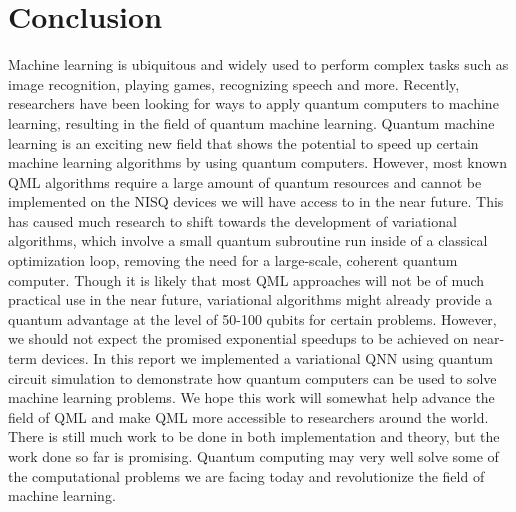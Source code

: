 \documentclass[a4paper,10pt]{article}
\begin{document}
\section{Conclusion} \label{sec:conclusion}
Machine learning is ubiquitous and widely used to perform complex tasks such as image recognition, playing games, recognizing speech and more.
Recently, researchers have been looking for ways to apply quantum computers to machine learning, resulting in the field of quantum machine learning.
Quantum machine learning is an exciting new field that shows the potential to speed up certain machine learning algorithms by using quantum computers.
However, most known QML algorithms require a large amount of quantum resources and cannot be implemented on the NISQ devices we will have access to in the near future.
This has caused much research to shift towards the development of variational algorithms, which involve a small quantum subroutine run inside of a classical optimization loop, removing the need for a large-scale, coherent quantum computer. 
Though it is likely that most QML approaches will not be of much practical use in the near future, variational algorithms might already provide a quantum advantage at the level of 50-100 qubits for certain problems.
However, we should not expect the promised exponential speedups to be achieved on near-term devices.
In this report we implemented a variational QNN using quantum circuit simulation to demonstrate how quantum computers can be used to solve machine learning problems.
We hope this work will somewhat help advance the field of QML and make QML more accessible to researchers around the world.
There is still much work to be done in both implementation and theory, but the work done so far is promising.
Quantum computing may very well solve some of the computational problems we are facing today and revolutionize the field of machine learning.

\clearpage

\printbibliography[heading=bibintoc]

\clearpage
\end{document}
